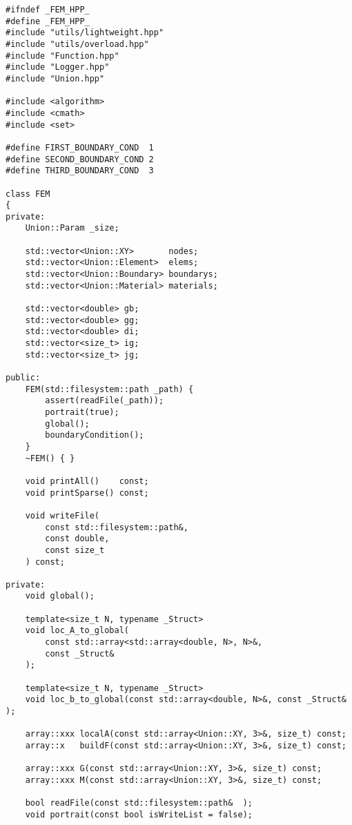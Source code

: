\documentclass[12pt,a4paper]{article}
\begin{document}
\begin{verbatim}
#ifndef _FEM_HPP_
#define _FEM_HPP_
#include "utils/lightweight.hpp"
#include "utils/overload.hpp"
#include "Function.hpp"
#include "Logger.hpp"
#include "Union.hpp"

#include <algorithm>
#include <cmath>
#include <set>

#define FIRST_BOUNDARY_COND  1
#define SECOND_BOUNDARY_COND 2
#define THIRD_BOUNDARY_COND  3

class FEM
{
private:
    Union::Param _size;

    std::vector<Union::XY>       nodes;
    std::vector<Union::Element>  elems;
    std::vector<Union::Boundary> boundarys;
    std::vector<Union::Material> materials;

    std::vector<double> gb;
    std::vector<double> gg;
    std::vector<double> di;
    std::vector<size_t> ig;
    std::vector<size_t> jg;

public:
    FEM(std::filesystem::path _path) {
        assert(readFile(_path));
        portrait(true);
        global();
        boundaryСondition();
    }
    ~FEM() { }

    void printAll()    const;
    void printSparse() const;

    void writeFile(
        const std::filesystem::path&,
        const double,
        const size_t
    ) const;

private:
    void global();

    template<size_t N, typename _Struct>
    void loc_A_to_global(
        const std::array<std::array<double, N>, N>&,
        const _Struct&
    );

    template<size_t N, typename _Struct>
    void loc_b_to_global(const std::array<double, N>&, const _Struct& );

    array::xxx localA(const std::array<Union::XY, 3>&, size_t) const;
    array::x   buildF(const std::array<Union::XY, 3>&, size_t) const;

    array::xxx G(const std::array<Union::XY, 3>&, size_t) const;
    array::xxx M(const std::array<Union::XY, 3>&, size_t) const;

    bool readFile(const std::filesystem::path&  );
    void portrait(const bool isWriteList = false);


\end{verbatim}
\end{document}
